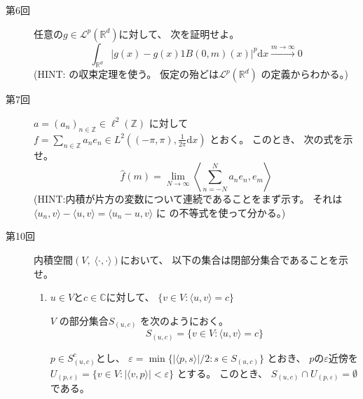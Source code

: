 \documentclass[12pt,b5paper]{ltjsarticle}
\begin{document}
\hrulefill

\begin{description}
 \item [第6回]
      任意の$g\in \mathcal{L}^{p}(\mathbb{R}^{d})$に対して、
      次を証明せよ。
      \begin{equation}
       \int_{\mathbb{R}^{d}}
        \lvert g(x) - g(x)1{B(0,m)}(x) \rvert^{p}
        \mathrm{d}x
        \overset{m \to \infty}{\longrightarrow}
        0
      \end{equation}
      (HINT:  の収束定理を使う。
      仮定の殆どは$\mathcal{L}^{p}(\mathbb{R}^{d})$
      の定義からわかる。)



 \item [第7回]
      $a = (a_{n})_{n\in\mathbb{Z}} \in \ell^{2}(\mathbb{Z})$
      に対して
      $f=\sum_{n\in\mathbb{Z}} a_{n}e_{n}
             \in L^{2}((-\pi,\pi),\frac{1}{2\pi}\mathrm{d}x)$
      とおく。
      このとき、
      次の式を示せ。
      \begin{equation}
       \hat{f}(m) = \lim_{N\to\infty}
        \left\langle \sum_{n=-N}^{N}a_{n}e_{n},e_{m} \right\rangle
      \end{equation}
      (HINT:内積が片方の変数について連続であることをまず示す。
      それは$\langle u_{n},v\rangle - \langle u,v\rangle
             = \langle u_{n}-u,v \rangle$ に
      の不等式を使って分かる。)

             \dotfill




            \hrulefill

\newpage

 \item [第10回]
      内積空間$(V,\; \langle \cdot , \cdot \rangle)$において、
      以下の集合は閉部分集合であることを示せ。
      \begin{enumerate}
       \item
            $u\in V$と$c\in \mathbb{C}$に対して、
            $\{ v\in V : \langle u,v\rangle =c \}$

            \dotfill

            $V$ の部分集合$S_{(u,c)}$ を次のようにおく。
            \begin{equation}
             S_{(u,c)} = \{ v\in V : \langle u,v\rangle =c \}
            \end{equation}

            $p \in S_{(u,c)}^{c}$とし、
            $\varepsilon=\min \{ \lvert \langle p,s \rangle \rvert/2 : s \in S_{(u,c)} \}$
            とおき、
            $p$の$\varepsilon$近傍を
            $U_{(p,\varepsilon)}= \{ v\in V : \lvert \langle v,p \rangle \rvert < \varepsilon \}$
            とする。
            このとき、
            $S_{(u,c)} \cap U_{(p,\varepsilon)} = \emptyset$
            である。


\end{enumerate}
\end{description}
\end{document}
